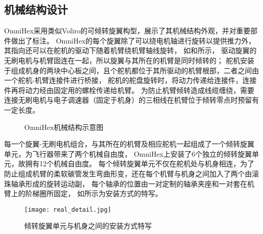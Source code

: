 \subsection{机械结构设计}\label{subsec:mechanical_structure_design}
OmniHex采用类似Voliro的可倾转旋翼构型，展示了其机械结构外观，并对重要部件做出了标注。
OmniHex的每个旋翼除了可以绕电机轴进行旋转以提供推力外，其指向还可以在舵机的驱动下随着机臂绕机臂轴线旋转，
如和所示，
驱动旋翼的无刷电机与机臂固连在一起，所以旋翼与其所在的机臂是同时倾转的；
舵机安装于组成机身的两块中心板之间，且个舵机都位于其所驱动的机臂根部，二者之间由一个舵机-机臂连接件进行桥接，
舵机的舵盘旋转时，将动力传递给连接件，连接件再将动力经由固定用的螺栓传递给机臂。
为防止机臂倾转造成线缆缠绕，需要连接无刷电机与电子调速器（固定于机身）的三相线在机臂位于倾转零点时预留有一定长度。
\begin{figure}[!ht]
    \setlength{\subfigcapskip}{-1bp}
    \centering
    \begin{minipage}{\textwidth}
    \centering
    \subfigure{\label{fig:structure_overview}}\addtocounter{subfigure}{-2}
    \hspace{0.2em}
    \subfigure{\label{fig:structure_detail_1}}\addtocounter{subfigure}{-2}

	\subfigure{\label{fig:structure_detail_2}}\addtocounter{subfigure}{-2}
    \end{minipage}
    \caption{OmniHex机械结构示意图\label{fig:omni_hex_structure}}
\end{figure}

每一个旋翼-无刷电机组合，与其所在的机臂及相应舵机一起组成了一个倾转旋翼单元，为飞行器带来了两个机械自由度，
OmniHex上安装了6个独立的倾转旋翼单元，故拥有12个机械自由度。
每个倾转旋翼单元不仅在舵机处与机身相连，为了防止组成机臂的柔软碳管发生弯曲形变，还在每个机臂与机身之间加入了两个由滚珠轴承形成的旋转运动副，
每个轴承的位置由一对定制的轴承夹座和一对套在机臂上的阶梯圈所固定，
如所示为安装方式的特写。
\begin{figure}[ht]
    \centering
    \texttt{[image: real\_detail.jpg]}
    \caption{倾转旋翼单元与机身之间的安装方式特写}
    \label{fig:real_detail}
\end{figure}

